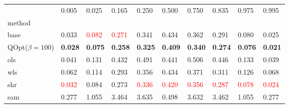 \begin{tabular}{llllllllll}
\toprule
 & 0.005 & 0.025 & 0.165 & 0.250 & 0.500 & 0.750 & 0.835 & 0.975 & 0.995 \\
method &  &  &  &  &  &  &  &  &  \\
\midrule
base & 0.033 & \textcolor{red}{0.082} & \textcolor{red}{0.271} & 0.341 & 0.434 & 0.362 & 0.291 & 0.080 & 0.025 \\
\midrule
QOpt($\beta=100$) & \textbf{0.028} & \textbf{0.075} & \textbf{0.258} & \textbf{0.325} & \textbf{0.409} & \textbf{0.340} & \textbf{0.274} & \textbf{0.076} & \textbf{0.021} \\
ols & 0.041 & 0.131 & 0.432 & 0.491 & 0.441 & 0.506 & 0.446 & 0.133 & 0.039 \\
wls & 0.062 & 0.114 & 0.293 & 0.356 & 0.434 & 0.371 & 0.311 & 0.126 & 0.068 \\
shr & \textcolor{red}{0.032} & 0.084 & 0.273 & \textcolor{red}{0.336} & \textcolor{red}{0.420} & \textcolor{red}{0.356} & \textcolor{red}{0.287} & \textcolor{red}{0.078} & \textcolor{red}{0.024} \\
sam & 0.277 & 1.055 & 3.464 & 3.635 & 0.498 & 3.632 & 3.462 & 1.055 & 0.277 \\
\bottomrule
\end{tabular}